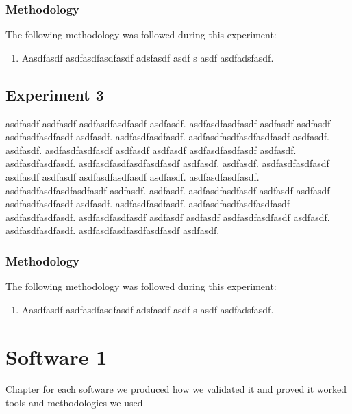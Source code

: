 \documentclass[runningheads,a4paper]{llncs}
\begin{document}
\subsection*{Methodology}
The following methodology was followed during this experiment:

\begin{enumerate}
	\item Aasdfasdf asdfasdfasdfasdf adsfasdf asdf s asdf  asdfadsfasdf. 
\end{enumerate}



\section*{Experiment 3}
asdfasdf asdfasdf asdfasdfasdfasdf asdfasdf. asdfasdfasdfasdf asdfasdf asdfasdf asdfasdfasdfasdf asdfasdf. asdfasdfasdfasdf. asdfasdfasdfasdfasdfasdf asdfasdf. asdfasdf. asdfasdfasdfasdf asdfasdf asdfasdf asdfasdfasdfasdf asdfasdf. asdfasdfasdfasdf. asdfasdfasdfasdfasdfasdf asdfasdf. asdfasdf. asdfasdfasdfasdf asdfasdf asdfasdf asdfasdfasdfasdf asdfasdf. asdfasdfasdfasdf. asdfasdfasdfasdfasdfasdf asdfasdf. asdfasdf. asdfasdfasdfasdf asdfasdf asdfasdf asdfasdfasdfasdf asdfasdf. asdfasdfasdfasdf. asdfasdfasdfasdfasdfasdf asdfasdfasdfasdf. asdfasdfasdfasdf asdfasdf asdfasdf asdfasdfasdfasdf asdfasdf. asdfasdfasdfasdf. asdfasdfasdfasdfasdfasdf asdfasdf.


\subsection*{Methodology}
The following methodology was followed during this experiment:

\begin{enumerate}
	\item Aasdfasdf asdfasdfasdfasdf adsfasdf asdf s asdf  asdfadsfasdf. 
\end{enumerate}



% 
\newpage
\chapter*{Software 1}

Chapter for each software we produced how we validated it and proved it worked tools and methodologies we used
\end{document}

